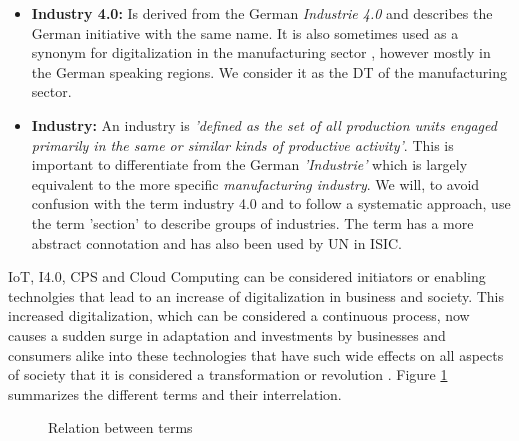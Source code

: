 \begin{itemize}
  \item  \textbf{Industry 4.0:} Is derived from the German \emph{Industrie 4.0} and describes the German initiative with the same name. It is also sometimes used as a synonym for digitalization in the manufacturing sector \cite{McKinseydigitizationIndustrialSector:2015}, however mostly in the German speaking regions. We consider it as the \acl{DT} of the manufacturing sector.


  \item \textbf{Industry:} An industry is \emph{'defined as the set of all production units engaged primarily in the same or similar kinds of productive activity'}\cite{ISIC:2008}. This is important to differentiate from the German \emph{'Industrie'} which is largely equivalent to the more specific \emph{manufacturing industry}. We will, to avoid confusion with the term industry 4.0 and to follow a systematic approach, use the term 'section' to describe groups of industries. The term has a more abstract connotation and has also been used by \ac{UN} in \ac{ISIC}\cite{ISIC:2008}. 

\end{itemize}

\ac{IoT}, \ac{I4.0}, \ac{CPS} and Cloud Computing can be considered initiators or enabling technolgies that lead to an increase of digitalization in business and society. This increased digitalization, which can be considered a continuous process, now causes a sudden surge in adaptation and investments by businesses and consumers alike into these technologies that have such wide effects on all aspects of society that it is considered a transformation or revolution \cite{Kagermann:2013}. 
Figure \ref{fig:terms} summarizes the different terms and their interrelation.

\begin{figure}[H]
\centering
{}
\caption{Relation between terms} \label{fig:terms}
\end{figure}

